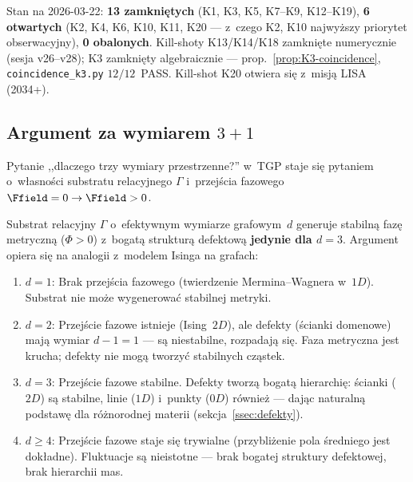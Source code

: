 \begin{remark}\label{rem:killshot-bilans}
Stan na 2026-03-22: \textbf{13 zamkni\k{e}tych}
(K1, K3, K5, K7--K9, K12--K19),
\textbf{6 otwartych} (K2, K4, K6, K10, K11, K20 --- z~czego K2, K10
najwy\.zszy priorytet obserwacyjny), \textbf{0 obalonych}.
Kill-shoty K13/K14/K18 zamkni\k{e}te numerycznie (sesja v26--v28);
K3 zamkni\k{e}ty algebraicznie --- prop.~\ref{prop:K3-coincidence},
\texttt{coincidence\_k3.py} $12/12$~PASS.
Kill-shot K20 otwiera si\k{e} z~misj\k{a} LISA (2034+).
\end{remark}

\subsection{Argument za wymiarem $3{+}1$}\label{ssec:wymiar}

Pytanie ,,dlaczego trzy wymiary przestrzenne?'' w~TGP staje
si\k{e} pytaniem o~w\l{}asno\'sci substratu relacyjnego $\Gamma$
i~przej\'scia fazowego $\Ffield = 0 \to \Ffield > 0$.

\begin{proposition}[Wymiar $d = 3$ jako optymalny
  dla TGP]\label{prop:wymiar}
Substrat relacyjny $\Gamma$ o~efektywnym wymiarze grafowym~$d$
generuje stabiln\k{a} faz\k{e} metryczn\k{a} ($\Phi > 0$)
z~bogat\k{a} struktur\k{a} defektow\k{a} \textbf{jedynie
dla $d = 3$}. Argument opiera si\k{e} na analogii z~modelem
Isinga na grafach:
\begin{enumerate}[nosep]
  \item \textbf{$d = 1$}: Brak przej\'scia fazowego
        (twierdzenie Mermina--Wagnera w~$1D$).
        Substrat nie mo\.ze wygenerowa\'c stabilnej metryki.
  \item \textbf{$d = 2$}: Przej\'scie fazowe istnieje
        (Ising~$2D$), ale defekty (\'scianki domenowe)
        maj\k{a} wymiar $d{-}1 = 1$ --- s\k{a} niestabilne,
        rozpadaj\k{a} si\k{e}. Faza metryczna jest krucha;
        defekty nie mog\k{a} tworzy\'c stabilnych cz\k{a}stek.
  \item \textbf{$d = 3$}: Przej\'scie fazowe stabilne.
        Defekty tworz\k{a} bogat\k{a} hierarchi\k{e}:
        \'scianki ($2D$) s\k{a} stabilne, linie ($1D$) i~punkty
        ($0D$) r\'ownie\.z --- daj\k{a}c naturaln\k{a}
        podstaw\k{e} dla r\'o\.znorodnej materii
        (sekcja~\ref{ssec:defekty}).
  \item \textbf{$d \geq 4$}: Przej\'scie fazowe staje si\k{e}
        trywialne (przybli\.zenie pola \'sredniego jest
        dok\l{}adne). Fluktuacje s\k{a} nieistotne ---
        brak bogatej struktury defektowej, brak hierarchii mas.
\end{enumerate}
\end{proposition}

